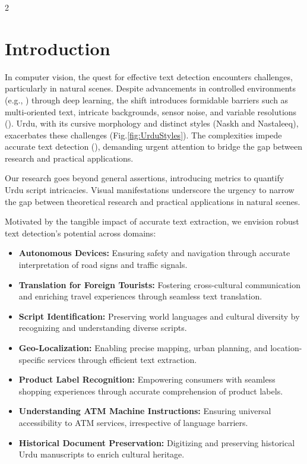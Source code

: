 \documentclass[sn-mathphys,Numbered]{sn-jnl}%
\begin{document}
\begin{multicols}{2}

\section{Introduction}

In computer vision, the quest for effective text detection encounters challenges, particularly in natural scenes. Despite advancements in controlled environments (e.g., \cite{Jaderberg2014, Gupta2023}) through deep learning, the shift introduces formidable barriers such as multi-oriented text, intricate backgrounds, sensor noise, and variable resolutions (\cite{Gomez2009, Sun2018, Khan2022}). Urdu, with its cursive morphology and distinct styles (Naskh and Nastaleeq), exacerbates these challenges (Fig.\ref{fig:UrduStyles}). The complexities impede accurate text detection (\cite{Shi2016}), demanding urgent attention to bridge the gap between research and practical applications.

Our research goes beyond general assertions, introducing metrics to quantify Urdu script intricacies. Visual manifestations underscore the urgency to narrow the gap between theoretical research and practical applications in natural scenes.

Motivated by the tangible impact of accurate text extraction, we envision robust text detection's potential across domains:
\begin{itemize}
	\item \textbf{Autonomous Devices:} Ensuring safety and navigation through accurate interpretation of road signs and traffic signals.
	\item \textbf{Translation for Foreign Tourists:} Fostering cross-cultural communication and enriching travel experiences through seamless text translation.
	\item \textbf{Script Identification:} Preserving world languages and cultural diversity by recognizing and understanding diverse scripts.
	\item \textbf{Geo-Localization:} Enabling precise mapping, urban planning, and location-specific services through efficient text extraction.
	\item \textbf{Product Label Recognition:} Empowering consumers with seamless shopping experiences through accurate comprehension of product labels.
	\item \textbf{Understanding ATM Machine Instructions:} Ensuring universal accessibility to ATM services, irrespective of language barriers.
	\item \textbf{Historical Document Preservation:} Digitizing and preserving historical Urdu manuscripts to enrich cultural heritage.
\end{itemize}


\end{multicols}
\end{document}
